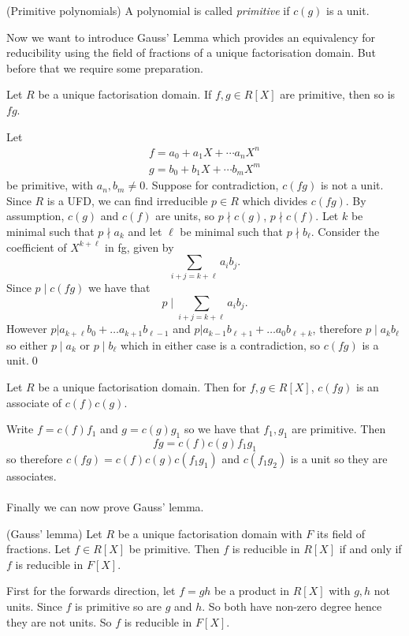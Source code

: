 \documentclass{article}
\begin{document}
\begin{itemize}
\begin{definition}
	(Primitive polynomials) A polynomial is called \textit{primitive} if $ c(g) $ is a unit.
\end{definition}
Now we want to introduce Gauss' Lemma which provides an equivalency for reducibility using the field of fractions of a unique factorisation domain. But before that we require some preparation.
\begin{lemma}
	Let $ R $ be a unique factorisation domain. If $ f,g\in R[X] $ are primitive, then so is $ fg $.
\end{lemma}
\pf Let
\begin{gather*}
  f=a_0+a_1X+\cdots a_nX^n \\
  g=b_0+b_1X+\cdots b_mX^m
\end{gather*}
be primitive, with $ a_n,b_m\ne 0 $. Suppose for contradiction, $ c(fg) $ is not a unit. Since $ R $ is a UFD, we can find irreducible $ p\in R $ which divides $ c(fg) $. By assumption, $ c(g) $ and $ c(f) $ are units, so $ p\nmid c(g) $, $ p\nmid c(f) $. Let $ k $ be minimal such that $ p\nmid a_k $ and let $ \ell $ be minimal such that $ p\nmid b_\ell $. Consider the coefficient of $ X^{k+\ell} $ in fg, given by
\[
	\sum_{i+j=k+\ell}a_ib_j.
\]
Since $ p\mid c(fg) $ we have that
\[
	p\mid \sum_{i+j=k+\ell}a_ib_j.
\]
However $ p|a_{k+\ell}b_0+\dots a_{k+1}b_{\ell -1} $ and $ p |a_{k-1}b_{\ell +1} + \dots a_0b_{\ell +k} $, therefore $ p\mid a_kb_\ell $ so either $ p\mid a_k $ or $ p\mid b_\ell $ which in either case is a contradiction, so $ c(fg) $ is a unit.\qed
\begin{corollary}
	Let $ R $ be a unique factorisation domain. Then for $ f,g\in R[X] $, $ c(fg) $ is an associate of $ c(f)c(g) $.
\end{corollary}
\pf Write $ f=c(f)f_1 $ and $ g=c(g)g_1 $ so we have that $ f_1,g_1 $ are primitive. Then 
\[
  fg=c(f)c(g)f_1g_1
\]
so therefore $ c(fg)=c(f)c(g)c(f_1g_1) $ and $ c(f_1g_2) $ is a unit so they are associates.
\\\\ Finally we can now prove Gauss' lemma.
\begin{lemma}
	(Gauss' lemma) Let $ R $ be a unique factorisation domain with $ F $ its field of fractions. Let $ f\in R[X] $ be primitive. Then $ f $ is reducible in $ R[X] $ if and only if $ f $ is reducible in $ F[X] $.
\end{lemma}
\pf First for the forwards direction, let $ f=gh $ be a product in $ R[X] $ with $ g,h $ not units. Since $ f $ is primitive so are $ g $ and $ h $. So both have non-zero degree hence they are not units. So $ f $ is reducible in $ F[X] $.\\

\end{itemize}
\end{document}
